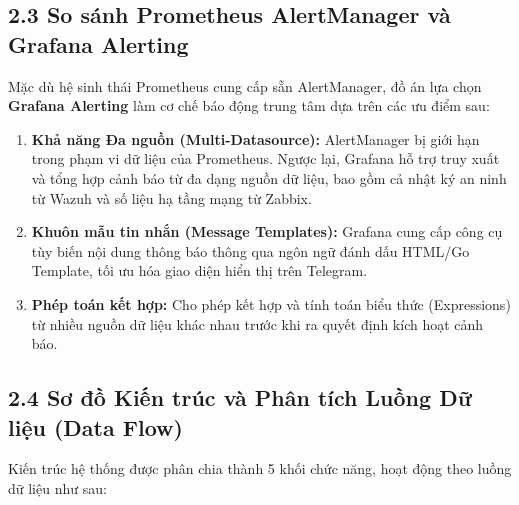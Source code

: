 \documentclass[13pt,a4paper]{extarticle}
\begin{document}
\subsection{2.3 So sánh Prometheus AlertManager và Grafana Alerting}
Mặc dù hệ sinh thái Prometheus cung cấp sẵn AlertManager, đồ án lựa chọn \textbf{Grafana Alerting} làm cơ chế báo động trung tâm dựa trên các ưu điểm sau:
\begin{enumerate}
    \item \textbf{Khả năng Đa nguồn (Multi-Datasource):} AlertManager bị giới hạn trong phạm vi dữ liệu của Prometheus. Ngược lại, Grafana hỗ trợ truy xuất và tổng hợp cảnh báo từ đa dạng nguồn dữ liệu, bao gồm cả nhật ký an ninh từ Wazuh và số liệu hạ tầng mạng từ Zabbix.
    \item \textbf{Khuôn mẫu tin nhắn (Message Templates):} Grafana cung cấp công cụ tùy biến nội dung thông báo thông qua ngôn ngữ đánh dấu HTML/Go Template, tối ưu hóa giao diện hiển thị trên Telegram.
    \item \textbf{Phép toán kết hợp:} Cho phép kết hợp và tính toán biểu thức (Expressions) từ nhiều nguồn dữ liệu khác nhau trước khi ra quyết định kích hoạt cảnh báo.
\end{enumerate}

\subsection{2.4 Sơ đồ Kiến trúc và Phân tích Luồng Dữ liệu (Data Flow)}
Kiến trúc hệ thống được phân chia thành 5 khối chức năng, hoạt động theo luồng dữ liệu như sau:
\end{document}
